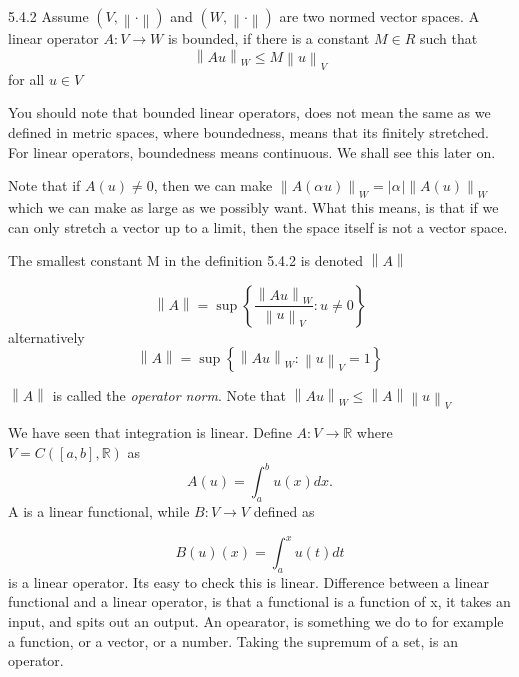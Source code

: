 \documentclass[a4paper,norsk]{article}
\renewcommand{\leq}{\leqslant}
\begin{document}
\begin{definitionbox}{5.4.2}{}
Assume $ \left( V, \left\lVert \cdot \right\rVert  \right)  $ and $ \left( W, \left\lVert \cdot \right\rVert  \right)  $ are two normed vector spaces. A linear operator $ A : V \to W $ is bounded, if there is a constant $ M \in R $ such that 
\[
    \left\lVert Au \right\rVert _{W} \leq M \left\lVert u \right\rVert _V
\]
for all $ u \in V $ 
\end{definitionbox}


You should note that bounded linear operators, does not mean the same as we defined in metric spaces, where boundedness, means that its finitely stretched. For linear operators, boundedness means continuous. We shall see this later on.


Note that if $ A \left( u \right) \neq 0 $, then we can make $ \left\lVert A \left( \alpha_{}^{} u \right)  \right\rVert_W = \left| \alpha_{}^{}  \right| \left\lVert A \left( u \right)   \right\rVert_W     $ which we can make as large as we possibly want. What this means, is that if we can only stretch a vector up to a limit, then the space itself is not a vector space.



The smallest constant M in the definition 5.4.2 is denoted $ \left\lVert A \right\rVert  $ 

\[
    \left\lVert A  \right\rVert = \sup \left\{ \frac{ \left\lVert A u \right\rVert _W }{ \left\lVert u \right\rVert _V } : u \neq 0 \right\} 
\]
alternatively
\[
    \left\lVert A \right\rVert = \sup \left\{ \left\lVert A u \right\rVert _W : \left\lVert u \right\rVert _V = 1 \right\} 
\]

$ \left\lVert A \right\rVert  $ is called the \textit{operator norm}. Note that $ \left\lVert A u \right\rVert _W \leq \left\lVert A \right\rVert \left\lVert u \right\rVert _V $ 



We have seen that integration is linear. Define $ A : V \to \mathbb{R} $ where $ V = C \left( \left[ a, b \right] , \mathbb{R} \right)  $ as
\[
    A (u) = \int_{a}^{b} u(x) dx.
\]
A is a linear functional, while $ B : V \to V $ defined as

\[
    B (u)(x) = \int_{a}^{x} u(t) dt 
\]
is a linear operator. Its easy to check this is linear. Difference between a linear functional and a linear operator, is that a functional is a function of x, it takes an input, and spits out an output. An opearator, is something we do to for example a function, or a vector, or a number. Taking the supremum of a set, is an operator. 
\end{document}
